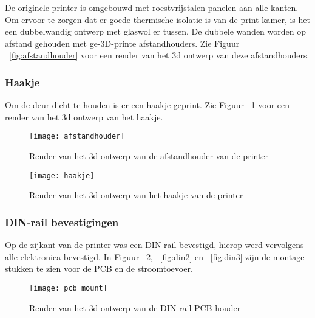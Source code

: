 De originele printer is omgebouwd met roestvrijstalen panelen aan alle kanten.
Om ervoor te zorgen dat er goede thermische isolatie is van de print kamer, is
het een dubbelwandig ontwerp met glaswol er tussen. De dubbele wanden worden op
afstand gehouden met ge-3D-printe afstandhouders. Zie Figuur
~\ref{fig:afstandhouder} voor een render van het \ac{3d} ontwerp van deze
afstandhouders.

\subsubsection{Haakje}

Om de deur dicht te houden is er een haakje geprint. Zie Figuur
~\ref{fig:haakje} voor een render van het \ac{3d} ontwerp van het haakje.

\begin{figure}[h]
    \centering
    \begin{minipage}{0.45\textwidth}
        \centerline{\texttt{[image: afstandhouder]}}
        \caption{Render van het \ac{3d} ontwerp van de afstandhouder van de printer}
        \label{fig:afstandhouder}
    \end{minipage}\hfill
    \begin{minipage}{0.45\textwidth}
        \centerline{\texttt{[image: haakje]}}
        \caption{Render van het \ac{3d} ontwerp van het haakje van de printer}
        \label{fig:haakje}
    \end{minipage}
\end{figure}

\subsubsection{DIN-rail bevestigingen}

Op de zijkant van de printer was een DIN-rail bevestigd, hierop werd vervolgens
alle elektronica bevestigd. In Figuur ~\ref{fig:din1}, ~\ref{fig:din2} en
~\ref{fig:din3} zijn de montage stukken te zien voor de PCB en de
stroomtoevoer.

\begin{figure}[h]
    \centerline{\texttt{[image: pcb\_mount]}}
    \caption{Render van het \ac{3d} ontwerp van de DIN-rail PCB houder}
    \label{fig:din1}
\end{figure}

